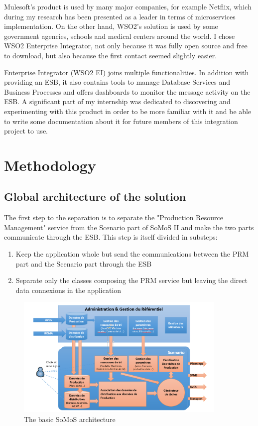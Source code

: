 \documentclass[12pt,a4paper,twoside]{article}
\begin{document}
Mulesoft's product is used by many major companies, for example Netflix, which during my research has been presented as a leader in terms of microservices implementation. On the other hand, WSO2's solution is used by some government agencies, schools and medical centers around the world. I chose WSO2 Enterprise Integrator, not only because it was fully open source and free to download, but also because the first contact seemed slightly easier. 

Enterprise Integrator (WSO2 EI) joins multiple functionalities. In addition with providing an ESB, it also contains tools to manage Database Services and Business Processes and offers dashboards to monitor the message activity on the ESB. A significant part of my internship was dedicated to discovering and experimenting with this product in order to be more familiar with it and be able to write some documentation about it for future members of this integration project to use. 
\section{Methodology}
\subsection{Global architecture of the solution}
The first step to the separation is to separate the "Production Resource Management" service from the Scenario part of SoMoS II and make the two parts communicate through the ESB. This step is itself divided in substeps:
\begin{enumerate}
	\item Keep the application whole but send the communications between the PRM part and the Scenario part through the ESB
	\item Separate only the classes composing the PRM service but leaving the direct data connexions in the application
\end{enumerate}
\begin{figure}[H]
\centering
\includegraphics[width=0.9\textwidth]{SOMOS_BASE.PNG}
\caption{\label{basic somos}The basic SoMoS architecture}
\end{figure}
\end{document}
